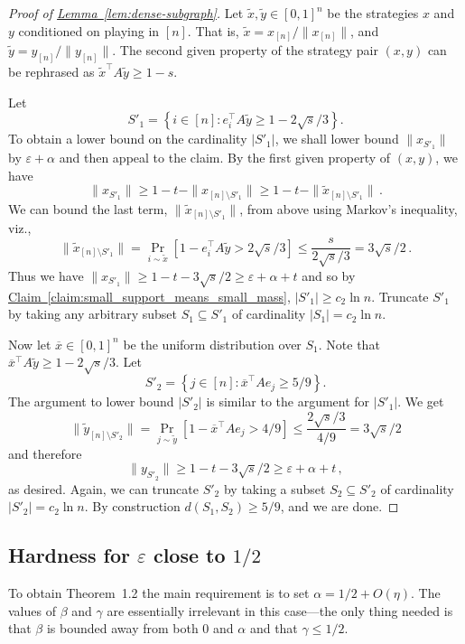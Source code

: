 \documentclass[10pt]{article}
\theoremstyle{definition}
\numberwithin{equation}{section}
\newcommand{\expref}[2]{\texorpdfstring{\hyperref[#2]{#1~\ref{#2}}}{#1~\ref{#2}}}
\newcommand{\eps}{\varepsilon}
\begin{document}
\begin{proof}[Proof of \expref{Lemma}{lem:dense-subgraph}]
  Let $\tilde{x}, \tilde{y} \in [0,1]^n$ be the strategies $x$ and $y$
  conditioned on playing in $[n]$.  That is,
  $\tilde{x}=x_{[n]}/\|x_{[n]}\|$, and
  $\tilde{y}=y_{[n]}/\|y_{[n]}\|$.  The second given property of the
  strategy pair $(x,y)$ can be rephrased as $\tilde{x}^{\top} A
  \tilde{y} \ge 1-s$.
  
  Let
  $$S'_1 = \left\{ i \in [n]: e_i^{\top} A \tilde{y} \ge
  1-2\sqrt{s}/3\right\}.$$ To obtain a lower bound on the cardinality $|S'_1|$, we shall lower bound
  $\|x_{S'_1}\|$ by $\eps + \alpha$ and then appeal to the claim.  By the first given property of $(x,y)$, we have 
  $$\|x_{S'_1}\| \ge 1-t - \|x_{[n] \setminus S'_1}\| \ge 1 - t - \|\tilde{x}_{[n]\setminus  S'_1}\|\,.$$
  We can bound the last term, $\|\tilde{x}_{[n] \setminus S'_1}\|$, from above using Markov's inequality, viz.,
  $$
  \|\tilde{x}_{[n] \setminus S'_1}\| = \Pr_{i \sim \tilde{x}}\left[1 - e_i^{\top} A \tilde{y} > 2\sqrt{s} /3\right] \le \frac{s}{2 \sqrt{s} / 3} = 3\sqrt{s}/2\,.
  $$ Thus we have $\|x_{S'_1}\| \ge 1 - t - 3\sqrt{s}/2 \ge \eps +
  \alpha + t$ and so by \expref{Claim}{claim:small_support_means_small_mass}, $|S'_1| \ge c_2 \ln n$.  Truncate $S'_1$
  by taking any arbitrary subset $S_1\subseteq S'_1$ of cardinality
  $|S_1|=c_2 \ln n$.
  
  Now let $\overline{x} \in [0,1]^n$ be the uniform distribution over
  $S_1$.  Note that $\overline{x}^{\top} A \tilde{y} \ge
  1-2\sqrt{s}/3$.  Let
  $$
  S'_2 = \left\{j \in [n]: \overline{x}^{\top} A e_j \ge 5/9\right\}.
  $$ The argument to lower bound $|S'_2|$ is similar to the argument
  for $|S'_1|$.  We get
  $$
  \|\tilde{y}_{[n] \setminus S'_2}\| = \Pr_{j \sim \tilde{y}}\left[1 - \overline{x}^{\top} A e_j > 4/9\right] \le \frac{2 \sqrt{s}/3}{4/9} = 3\sqrt{s}/2
  $$
  and therefore
  $$\|y_{S'_2}\| \ge 1 - t - 3 \sqrt{s}/2 \ge \eps + \alpha + t\,,$$
  as desired.  Again, we can truncate $S'_2$ by taking a subset $S_2\subseteq S'_2$ of cardinality $|S'_2|=c_2\ln n$. By construction $d(S_1, S_2) \ge 5/9$, and we are done.
%
\end{proof}


\subsection{\texorpdfstring{Hardness for $\eps$ close to $1/2$}{Hardness for epsilon close to 1/2}}\label{sec:eps-hardness}

To obtain Theorem~1.2 the main requirement is to
set $\alpha = {1}/{2} + O(\eta)$.  The values of $\beta$ and $\gamma$ are
essentially irrelevant in this case---the only thing needed is
that $\beta$ is bounded away from both $0$ and $\alpha$ and that $\gamma
\le {1}/{2}$.
\end{document}
